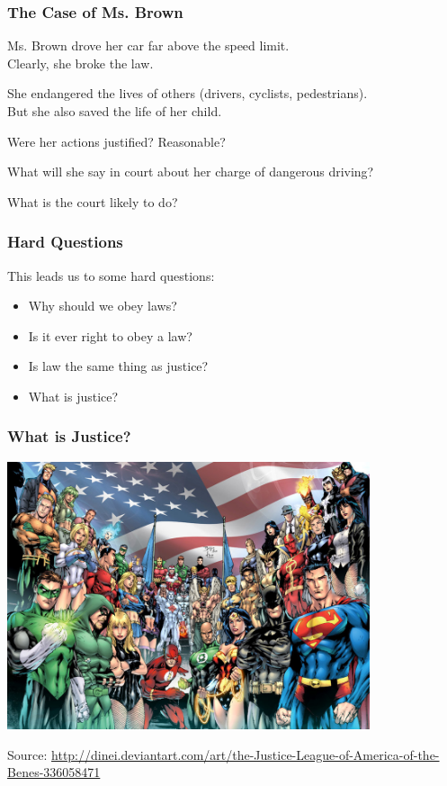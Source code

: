 \begin{frame}
\frametitle{The Case of Ms. Brown}

Ms. Brown drove her car far above the speed limit.\\
\quad Clearly, she broke the law.

She endangered the lives of others (drivers, cyclists, pedestrians).\\
\quad But she also saved the life of her child.

Were her actions justified? Reasonable?

What will she say in court about her charge of dangerous driving?

What is the court likely to do?

\end{frame}



\begin{frame}
\frametitle{Hard Questions}

This leads us to some hard questions:

\begin{itemize}
	\item Why should we obey laws?
	\item Is it ever right to obey a law?
	\item Is law the same thing as justice? 
	\item What is justice?
\end{itemize}


\end{frame}


\begin{frame}
\frametitle{What is Justice?}

\begin{center}
\includegraphics[width=0.8\textwidth]{images/justiceleague-dinei.jpg}
\end{center}
{\scriptsize Source: \url{http://dinei.deviantart.com/art/the-Justice-League-of-America-of-the-Benes-336058471}}

\end{frame}


